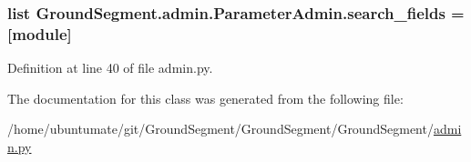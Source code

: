 \hypertarget{class_ground_segment_1_1admin_1_1_parameter_admin_aa50da80cc9ee5d5dcbad140ad78d5cf7}{}
\subsubsection[{search\+\_\+fields}]{\setlength{\rightskip}{0pt plus 5cm}list Ground\+Segment.\+admin.\+Parameter\+Admin.\+search\+\_\+fields = \mbox{[}\textquotesingle{}module\textquotesingle{}\mbox{]}\hspace{0.3cm}{\ttfamily [static]}}\label{class_ground_segment_1_1admin_1_1_parameter_admin_aa50da80cc9ee5d5dcbad140ad78d5cf7}


Definition at line 40 of file admin.\+py.



The documentation for this class was generated from the following file\+:\begin{DoxyCompactItemize}
\item 
/home/ubuntumate/git/\+Ground\+Segment/\+Ground\+Segment/\+Ground\+Segment/\hyperlink{admin_8py}{admin.\+py}\end{DoxyCompactItemize}
